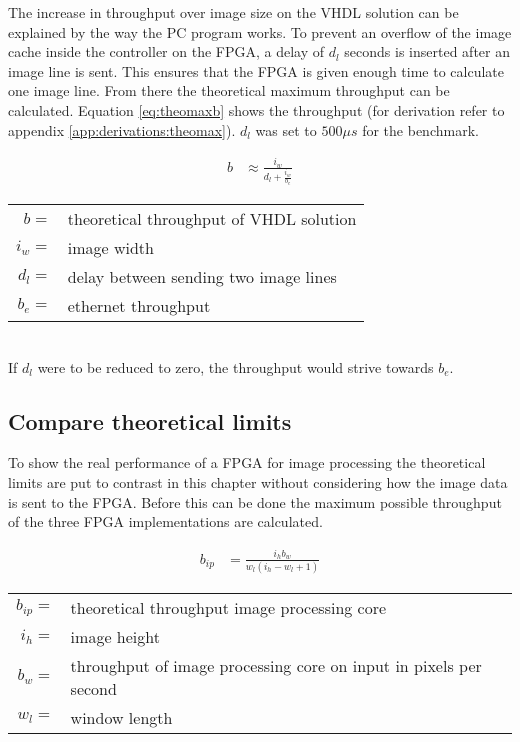 The increase in throughput over image size on the VHDL solution can be explained
by the way the
PC program works. To prevent an overflow of the image cache inside the
controller on the FPGA, a delay of $d_l$ seconds is inserted after an image line
is sent. This ensures that the FPGA is given enough time to calculate one image
line. From there the theoretical maximum throughput can be calculated. Equation
\ref{eq:theomaxb} shows the throughput (for derivation refer to appendix 
\ref{app:derivations:theomax}). $d_l$ was set to $500\mu s$ for the benchmark.

\begin{align}
    b  & \approx \frac{i_w}{d_l + \frac{i_w}{b_e}}
    \label{eq:theomaxb}
\end{align}

\begin{tabular}{rl}
    $b     =$ & theoretical throughput of VHDL solution \\
    $i_w   =$ & image width \\
    $d_l   =$ & delay between sending two image lines \\
    $b_e   =$ & ethernet throughput \\
\end{tabular} \\

If $d_l$ were to be reduced to zero, the throughput would strive towards $b_e$.

\subsection{Compare theoretical limits}
To show the real performance of a FPGA for image processing the theoretical
limits are put to contrast in this chapter without considering how the image
data is sent to the FPGA.
Before this can be done the maximum possible throughput of the three FPGA
implementations are calculated.

\begin{align}
    b_{ip}  & = \frac{i_hb_w}{w_l (i_h-w_l+1)}
    \label{eq:theomaxvhdlwallisshort}
\end{align}

\begin{tabular}{rl}
    $b_{ip}=$ & theoretical throughput image processing core \\
    $i_h   =$ & image height \\
    $b_w   =$ & throughput of image processing core on input in pixels per
    second \\
    $w_l   =$ & window length \\
\end{tabular} \\

